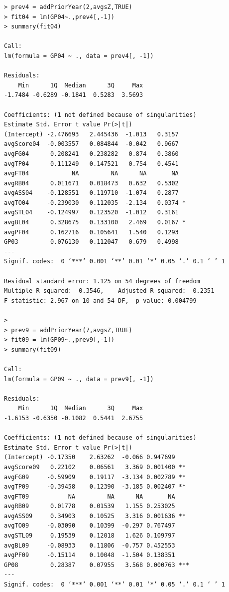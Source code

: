 \documentclass[]{scrartcl}
\begin{document}
\begin{verbatim}
> prev4 = addPriorYear(2,avgsZ,TRUE)
> fit04 = lm(GP04~.,prev4[,-1])
> summary(fit04)

Call:
lm(formula = GP04 ~ ., data = prev4[, -1])

Residuals:
    Min      1Q  Median      3Q     Max 
-1.7484 -0.6289 -0.1841  0.5283  3.5693 

Coefficients: (1 not defined because of singularities)
Estimate Std. Error t value Pr(>|t|)  
(Intercept) -2.476693   2.445436  -1.013   0.3157  
avgScore04  -0.003557   0.084844  -0.042   0.9667  
avgFG04      0.208241   0.238282   0.874   0.3860  
avgTP04      0.111249   0.147521   0.754   0.4541  
avgFT04            NA         NA      NA       NA  
avgRB04      0.011671   0.018473   0.632   0.5302  
avgASS04    -0.128551   0.119710  -1.074   0.2877  
avgTO04     -0.239030   0.112035  -2.134   0.0374 *
avgSTL04    -0.124997   0.123520  -1.012   0.3161  
avgBL04      0.328675   0.133100   2.469   0.0167 *
avgPF04      0.162716   0.105641   1.540   0.1293  
GP03         0.076130   0.112047   0.679   0.4998  
---
Signif. codes:  0 ‘***’ 0.001 ‘**’ 0.01 ‘*’ 0.05 ‘.’ 0.1 ‘ ’ 1

Residual standard error: 1.125 on 54 degrees of freedom
Multiple R-squared:  0.3546,	Adjusted R-squared:  0.2351 
F-statistic: 2.967 on 10 and 54 DF,  p-value: 0.004799

>
> prev9 = addPriorYear(7,avgsZ,TRUE)
> fit09 = lm(GP09~.,prev9[,-1])
> summary(fit09)

Call:
lm(formula = GP09 ~ ., data = prev9[, -1])

Residuals:
    Min      1Q  Median      3Q     Max 
-1.6153 -0.6350 -0.1082  0.5441  2.6755 

Coefficients: (1 not defined because of singularities)
Estimate Std. Error t value Pr(>|t|)    
(Intercept) -0.17350    2.63262  -0.066 0.947699    
avgScore09   0.22102    0.06561   3.369 0.001400 ** 
avgFG09     -0.59909    0.19117  -3.134 0.002789 ** 
avgTP09     -0.39458    0.12390  -3.185 0.002407 ** 
avgFT09           NA         NA      NA       NA    
avgRB09      0.01778    0.01539   1.155 0.253025    
avgASS09     0.34903    0.10525   3.316 0.001636 ** 
avgTO09     -0.03090    0.10399  -0.297 0.767497    
avgSTL09     0.19539    0.12018   1.626 0.109797    
avgBL09     -0.08933    0.11806  -0.757 0.452553    
avgPF09     -0.15114    0.10048  -1.504 0.138351    
GP08         0.28387    0.07955   3.568 0.000763 ***
---
Signif. codes:  0 ‘***’ 0.001 ‘**’ 0.01 ‘*’ 0.05 ‘.’ 0.1 ‘ ’ 1


\end{verbatim}
\end{document}
